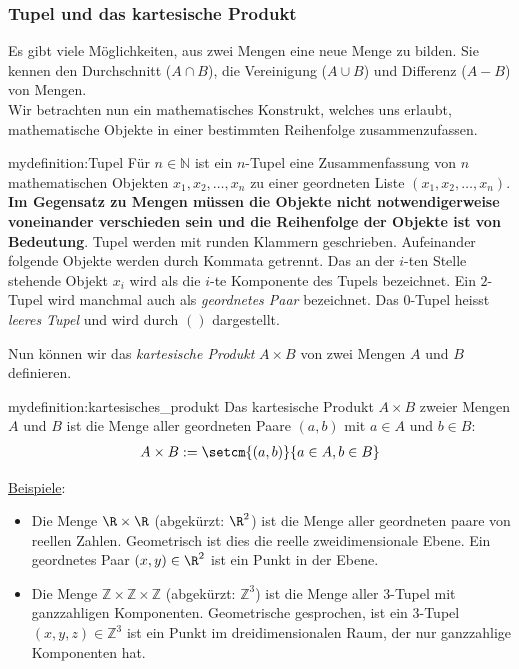 \subsubsection{Tupel und das kartesische Produkt}
Es gibt viele Möglichkeiten, aus zwei Mengen eine neue Menge zu bilden. Sie kennen den Durchschnitt ($A\cap B$), die Vereinigung ($A\cup B$) und Differenz ($A - B$) von Mengen.\\
Wir betrachten nun ein mathematisches Konstrukt, welches uns erlaubt, mathematische Objekte in einer bestimmten Reihenfolge zusammenzufassen.
\begin{mydefinition}[Tupel]{mydefinition:Tupel}
Für $n\in\mathbb{N}$ ist ein $n$-Tupel eine Zusammenfassung von $n$ mathematischen Objekten $x_1,x_2,\ldots , x_n$ zu einer geordneten Liste $(x_1, x_2, \ldots  , x_n)$. \textbf{Im Gegensatz zu Mengen müssen die Objekte nicht notwendigerweise voneinander verschieden sein und die Reihenfolge der Objekte ist von Bedeutung}. Tupel werden mit runden Klammern geschrieben. Aufeinander folgende Objekte werden durch Kommata getrennt. Das an der $i$-ten Stelle stehende Objekt $x_i$ wird als die $i$-te Komponente des Tupels bezeichnet. Ein $2$-Tupel wird manchmal auch als \textit{geordnetes Paar} bezeichnet. Das $0$-Tupel heisst \textit{leeres Tupel} und wird durch $()$ dargestellt.\\
\end{mydefinition}
\clearpage
Nun können wir das \textit{kartesische Produkt} $A\times B$ von zwei Mengen $A$ und $B$ definieren.
\begin{mydefinition}{mydefinition:kartesisches_produkt}
Das kartesische Produkt $A\times B$ zweier Mengen $A$ und $B$ ist die Menge aller geordneten Paare $(a,b)$ mit $a\in A$ und $b\in B$:
\begin{align*}
	A\times B := \setcm{(a,b)}{a\in A, b\in B}
\end{align*}
\end{mydefinition}
\underline{Beispiele}:
\begin{itemize}
	\item Die Menge $\R\times \R$ (abgekürzt: $\R^2$) ist die Menge aller geordneten paare von reellen Zahlen. Geometrisch ist dies die reelle zweidimensionale Ebene. Ein geordnetes Paar $(x,y)\in\R^2$ ist ein Punkt in der Ebene.
	\item Die Menge $\mathbb{Z}\times \mathbb{Z} \times \mathbb{Z}$ (abgekürzt: $\mathbb{Z}^3$) ist die Menge aller $3$-Tupel mit ganzzahligen Komponenten. Geometrische gesprochen, ist ein $3$-Tupel $(x,y,z)\in\mathbb{Z}^3$ ist ein Punkt im dreidimensionalen Raum, der nur ganzzahlige Komponenten hat.
\end{itemize}

